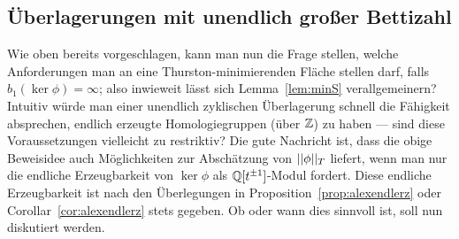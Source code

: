     \subsection{Überlagerungen mit unendlich großer Bettizahl}
        
    \label{verallggruppenring}
    Wie oben bereits vorgeschlagen, kann man nun die Frage stellen, welche Anforderungen man an eine Thurston-minimierenden Fläche stellen darf, falls $b_1(\ker\phi)=\infty$; also inwieweit lässt sich Lemma~\ref{lem:minS} verallgemeinern? Intuitiv würde man einer unendlich zyklischen Überlagerung schnell die Fähigkeit absprechen, endlich erzeugte Homologiegruppen (über $\mathbb{Z}$) zu haben --- sind diese Voraussetzungen vielleicht zu restriktiv? Die gute Nachricht ist, dass die obige Beweisidee auch Möglichkeiten zur Abschätzung von $||\phi||_T$ liefert, wenn man nur die endliche Erzeugbarkeit von $\ker\phi$ als $\mathbb{Q}[t^{\pm 1}]$-Modul fordert. Diese endliche Erzeugbarkeit ist nach den Überlegungen in Proposition~\ref{prop:alexendlerz} oder Corollar~\ref{cor:alexendlerz} stets gegeben. Ob oder wann dies sinnvoll ist, soll nun diskutiert werden.


